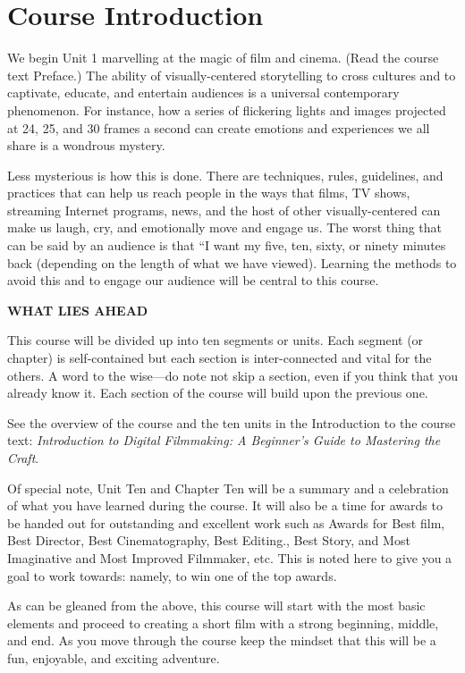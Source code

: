 \documentclass[
]{book}
\begin{document}
\hypertarget{course-introduction}{%
\section{Course Introduction}\label{course-introduction}}

We begin Unit 1 marvelling at the magic of film and cinema. (Read the course text Preface.) The ability of visually-centered storytelling to cross cultures and to captivate, educate, and entertain audiences is a universal contemporary phenomenon. For instance, how a series of flickering lights and images projected at 24, 25, and 30 frames a second can create emotions and experiences we all share is a wondrous mystery.

Less mysterious is how this is done. There are techniques, rules, guidelines, and practices that can help us reach people in the ways that films, TV shows, streaming Internet programs, news, and the host of other visually-centered can make us laugh, cry, and emotionally move and engage us. The worst thing that can be said by an audience is that ``I want my five, ten, sixty, or ninety minutes back (depending on the length of what we have viewed). Learning the methods to avoid this and to engage our audience will be central to this course.

\textbf{WHAT LIES AHEAD}

This course will be divided up into ten segments or units. Each segment (or chapter) is self-contained but each section is inter-connected and vital for the others. A word to the wise---do note not skip a section, even if you think that you already know it. Each section of the course will build upon the previous one.

See the overview of the course and the ten units in the Introduction to the course text: \emph{Introduction to Digital Filmmaking: A Beginner's Guide to Mastering the Craft}.

Of special note, Unit Ten and Chapter Ten will be a summary and a celebration of what you have learned during the course. It will also be a time for awards to be handed out for outstanding and excellent work such as Awards for Best film, Best Director, Best Cinematography, Best Editing., Best Story, and Most Imaginative and Most Improved Filmmaker, etc. This is noted here to give you a goal to work towards: namely, to win one of the top awards.

As can be gleaned from the above, this course will start with the most basic elements and proceed to creating a short film with a strong beginning, middle, and end. As you move through the course keep the mindset that this will be a fun, enjoyable, and exciting adventure.
\end{document}
